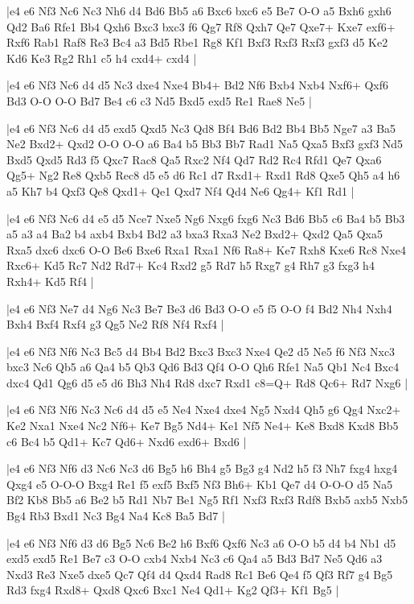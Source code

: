 \whitename{}
\blackname{}
\makegametitle
|e4 e6 Nf3 Nc6 Nc3 Nh6 d4 Bd6 Bb5 a6 Bxc6 bxc6 e5 Be7 O-O a5 Bxh6 gxh6 Qd2 Ba6 Rfe1 Bb4 Qxh6 Bxc3 bxc3 f6 Qg7 Rf8 Qxh7 Qe7 Qxe7+ Kxe7 exf6+ Rxf6 Rab1 Raf8 Re3 Bc4 a3 Bd5 Rbe1 Rg8 Kf1 Bxf3 Rxf3 Rxf3 gxf3 d5 Ke2 Kd6 Ke3 Rg2 Rh1 c5 h4 cxd4+ cxd4  |

\whitename{}
\blackname{}
\makegametitle
|e4 e6 Nf3 Nc6 d4 d5 Nc3 dxe4 Nxe4 Bb4+ Bd2 Nf6 Bxb4 Nxb4 Nxf6+ Qxf6 Bd3 O-O O-O Bd7 Be4 c6 c3 Nd5 Bxd5 exd5 Re1 Rae8 Ne5  |

\whitename{}
\blackname{}
\makegametitle
|e4 e6 Nf3 Nc6 d4 d5 exd5 Qxd5 Nc3 Qd8 Bf4 Bd6 Bd2 Bb4 Bb5 Nge7 a3 Ba5 Ne2 Bxd2+ Qxd2 O-O O-O a6 Ba4 b5 Bb3 Bb7 Rad1 Na5 Qxa5 Bxf3 gxf3 Nd5 Bxd5 Qxd5 Rd3 f5 Qxc7 Rac8 Qa5 Rxc2 Nf4 Qd7 Rd2 Rc4 Rfd1 Qe7 Qxa6 Qg5+ Ng2 Re8 Qxb5 Rec8 d5 e5 d6 Rc1 d7 Rxd1+ Rxd1 Rd8 Qxe5 Qh5 a4 h6 a5 Kh7 b4 Qxf3 Qe8 Qxd1+ Qe1 Qxd7 Nf4 Qd4 Ne6 Qg4+ Kf1 Rd1  |

\whitename{}
\blackname{}
\makegametitle
|e4 e6 Nf3 Nc6 d4 e5 d5 Nce7 Nxe5 Ng6 Nxg6 fxg6 Nc3 Bd6 Bb5 c6 Ba4 b5 Bb3 a5 a3 a4 Ba2 b4 axb4 Bxb4 Bd2 a3 bxa3 Rxa3 Ne2 Bxd2+ Qxd2 Qa5 Qxa5 Rxa5 dxc6 dxc6 O-O Be6 Bxe6 Rxa1 Rxa1 Nf6 Ra8+ Ke7 Rxh8 Kxe6 Rc8 Nxe4 Rxc6+ Kd5 Rc7 Nd2 Rd7+ Kc4 Rxd2 g5 Rd7 h5 Rxg7 g4 Rh7 g3 fxg3 h4 Rxh4+ Kd5 Rf4  |

\whitename{}
\blackname{}
\makegametitle
|e4 e6 Nf3 Ne7 d4 Ng6 Nc3 Be7 Be3 d6 Bd3 O-O e5 f5 O-O f4 Bd2 Nh4 Nxh4 Bxh4 Bxf4 Rxf4 g3 Qg5 Ne2 Rf8 Nf4 Rxf4  |

\whitename{}
\blackname{}
\makegametitle
|e4 e6 Nf3 Nf6 Nc3 Bc5 d4 Bb4 Bd2 Bxc3 Bxc3 Nxe4 Qe2 d5 Ne5 f6 Nf3 Nxc3 bxc3 Nc6 Qb5 a6 Qa4 b5 Qb3 Qd6 Bd3 Qf4 O-O Qh6 Rfe1 Na5 Qb1 Nc4 Bxc4 dxc4 Qd1 Qg6 d5 e5 d6 Bh3 Nh4 Rd8 dxc7 Rxd1 c8=Q+ Rd8 Qc6+ Rd7 Nxg6  |

\whitename{}
\blackname{}
\makegametitle
|e4 e6 Nf3 Nf6 Nc3 Nc6 d4 d5 e5 Ne4 Nxe4 dxe4 Ng5 Nxd4 Qh5 g6 Qg4 Nxc2+ Ke2 Nxa1 Nxe4 Nc2 Nf6+ Ke7 Bg5 Nd4+ Ke1 Nf5 Ne4+ Ke8 Bxd8 Kxd8 Bb5 c6 Bc4 b5 Qd1+ Kc7 Qd6+ Nxd6 exd6+ Bxd6  |

\whitename{}
\blackname{}
\makegametitle
|e4 e6 Nf3 Nf6 d3 Nc6 Nc3 d6 Bg5 h6 Bh4 g5 Bg3 g4 Nd2 h5 f3 Nh7 fxg4 hxg4 Qxg4 e5 O-O-O Bxg4 Re1 f5 exf5 Bxf5 Nf3 Bh6+ Kb1 Qe7 d4 O-O-O d5 Na5 Bf2 Kb8 Bb5 a6 Be2 b5 Rd1 Nb7 Be1 Ng5 Rf1 Nxf3 Rxf3 Rdf8 Bxb5 axb5 Nxb5 Bg4 Rb3 Bxd1 Nc3 Bg4 Na4 Kc8 Ba5 Bd7  |

\whitename{}
\blackname{}
\makegametitle
|e4 e6 Nf3 Nf6 d3 d6 Bg5 Nc6 Be2 h6 Bxf6 Qxf6 Nc3 a6 O-O b5 d4 b4 Nb1 d5 exd5 exd5 Re1 Be7 c3 O-O cxb4 Nxb4 Nc3 c6 Qa4 a5 Bd3 Bd7 Ne5 Qd6 a3 Nxd3 Re3 Nxe5 dxe5 Qc7 Qf4 d4 Qxd4 Rad8 Rc1 Be6 Qe4 f5 Qf3 Rf7 g4 Bg5 Rd3 fxg4 Rxd8+ Qxd8 Qxc6 Bxc1 Ne4 Qd1+ Kg2 Qf3+ Kf1 Bg5  |

